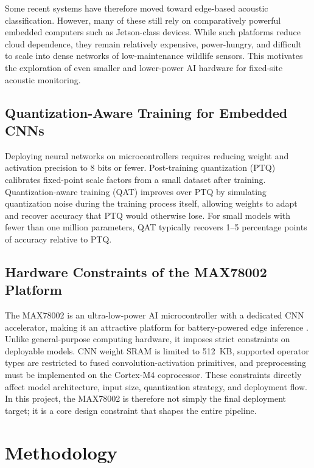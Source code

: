 \documentclass[conference]{IEEEtran}
\begin{document}
Some recent systems have therefore moved toward edge-based acoustic classification. However, many of these still rely on comparatively powerful embedded computers such as Jetson-class devices. While such platforms reduce cloud dependence, they remain relatively expensive, power-hungry, and difficult to scale into dense networks of low-maintenance wildlife sensors. This motivates the exploration of even smaller and lower-power AI hardware for fixed-site acoustic monitoring.

\subsection{Quantization-Aware Training for Embedded CNNs}
Deploying neural networks on microcontrollers requires reducing weight and activation precision to 8 bits or fewer. Post-training quantization (PTQ) calibrates fixed-point scale factors from a small dataset after training. Quantization-aware training (QAT) \cite{jacob2018quantization} improves over PTQ by simulating quantization noise during the training process itself, allowing weights to adapt and recover accuracy that PTQ would otherwise lose. For small models with fewer than one million parameters, QAT typically recovers 1--5 percentage points of accuracy relative to PTQ.

\subsection{Hardware Constraints of the MAX78002 Platform}
The MAX78002 is an ultra-low-power AI microcontroller with a dedicated CNN accelerator, making it an attractive platform for battery-powered edge inference \cite{adi2022training}. Unlike general-purpose computing hardware, it imposes strict constraints on deployable models. CNN weight SRAM is limited to 512~KB, supported operator types are restricted to fused convolution-activation primitives, and preprocessing must be implemented on the Cortex-M4 coprocessor. These constraints directly affect model architecture, input size, quantization strategy, and deployment flow. In this project, the MAX78002 is therefore not simply the final deployment target; it is a core design constraint that shapes the entire pipeline.

\section{Methodology}
\end{document}

